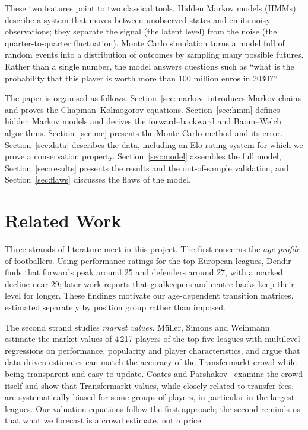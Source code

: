 \documentclass[11pt]{amsart}
\theoremstyle{definition}
\theoremstyle{remark}
\begin{document}
These two features point to two classical tools. Hidden Markov models (HMMs) describe a system that moves between unobserved states and emits noisy observations; they separate the signal (the latent level) from the noise (the quarter-to-quarter fluctuation). Monte Carlo simulation turns a model full of random events into a distribution of outcomes by sampling many possible futures. Rather than a single number, the model answers questions such as ``what is the probability that this player is worth more than 100 million euros in 2030?''

The paper is organised as follows. Section~\ref{sec:markov} introduces Markov chains and proves the Chapman--Kolmogorov equations. Section~\ref{sec:hmm} defines hidden Markov models and derives the forward--backward and Baum--Welch algorithms. Section~\ref{sec:mc} presents the Monte Carlo method and its error. Section~\ref{sec:data} describes the data, including an Elo rating system for which we prove a conservation property. Section~\ref{sec:model} assembles the full model, Section~\ref{sec:results} presents the results and the out-of-sample validation, and Section~\ref{sec:flaws} discusses the flaws of the model.

\section{Related Work}\label{sec:related}

Three strands of literature meet in this project. The first concerns the \emph{age profile} of footballers. Using performance ratings for the top European leagues, Dendir~\cite{dendir} finds that forwards peak around 25 and defenders around 27, with a marked decline near 29; later work reports that goalkeepers and centre-backs keep their level for longer. These findings motivate our age-dependent transition matrices, estimated separately by position group rather than imposed.

The second strand studies \emph{market values}. M\"uller, Simons and Weinmann~\cite{muller} estimate the market values of 4\,217 players of the top five leagues with multilevel regressions on performance, popularity and player characteristics, and argue that data-driven estimates can match the accuracy of the Transfermarkt crowd while being transparent and easy to update. Coates and Parshakov~\cite{coates} examine the crowd itself and show that Transfermarkt values, while closely related to transfer fees, are systematically biased for some groups of players, in particular in the largest leagues. Our valuation equations follow the first approach; the second reminds us that what we forecast is a crowd estimate, not a price.
\end{document}
